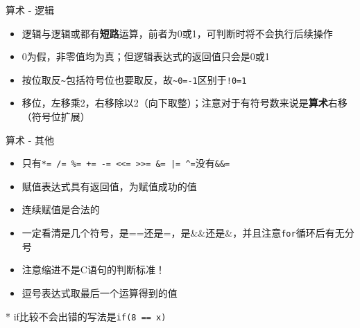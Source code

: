 \documentclass{myslide}
\begin{document}
\begin{frame}[fragile]{算术 - 逻辑}
\begin{itemize}[<+->]
	\item 逻辑与逻辑或都有\textbf{短路}运算，前者为0或1，可判断时将不会执行后续操作
	\item 0为假，非零值均为真；但逻辑表达式的返回值只会是0或1
	\item 按位取反\verb'~'包括符号位也要取反，故\verb'~0=-1'区别于\verb'!0=1'
	\item 移位，左移乘2，右移除以2（向下取整）；注意对于有符号数来说是\textbf{算术}右移（符号位扩展）
\end{itemize}
\end{frame}

\begin{frame}[fragile]{算术 - 其他}
\begin{itemize}[<+->]
	\item 只有\verb'*= /= %= += -= <<= >>= &= |= ^='没有\verb'&&='
	\item 赋值表达式具有返回值，为赋值成功的值
	\item 连续赋值是合法的
	\item 一定看清是几个符号，是==还是=，是\&\&还是\&，并且注意\verb'for'循环后有无分号
	\item 注意缩进不是C语句的判断标准！
	\item 逗号表达式取最后一个运算得到的值
\end{itemize}
\pause
* if比较不会出错的写法是\verb'if(8 == x)'
\end{frame}
\end{document}
